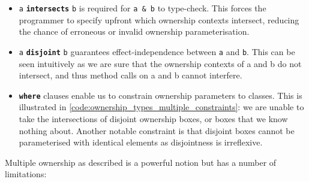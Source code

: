 \documentclass{acm_proc_article-sp}
\begin{document}
\begin{itemize}

	\item \lstinline{a} \textbf{\lstinline|intersects|} \lstinline{b} is
		required for \lstinline|a & b| to type-check. This forces the programmer
		to specify upfront which ownership contexts intersect, reducing the
		chance of erroneous or invalid ownership parameterisation.

	\item \lstinline{a} \textbf{\lstinline|disjoint|} \lstinline{b} guarantees
		effect-independence between \lstinline{a} and \lstinline{b}. This can be
		seen intuitively as we are sure that the ownership contexts of a and b
		do not intersect, and thus method calls on a and b cannot interfere.

	\item \textbf{\lstinline|where|} clauses enable us to constrain ownership
		parameters to classes. This is illustrated in
		\cref{code:ownership_types_multiple_constraints}: we are unable to take
		the intersections of disjoint ownership boxes, or boxes that we know
		nothing about. Another notable constraint is that disjoint boxes cannot
		be parameterised with identical elements as disjointness is irreflexive.

\end{itemize}



Multiple ownership as described is a powerful notion but has a number of
limitations:
\end{document}
